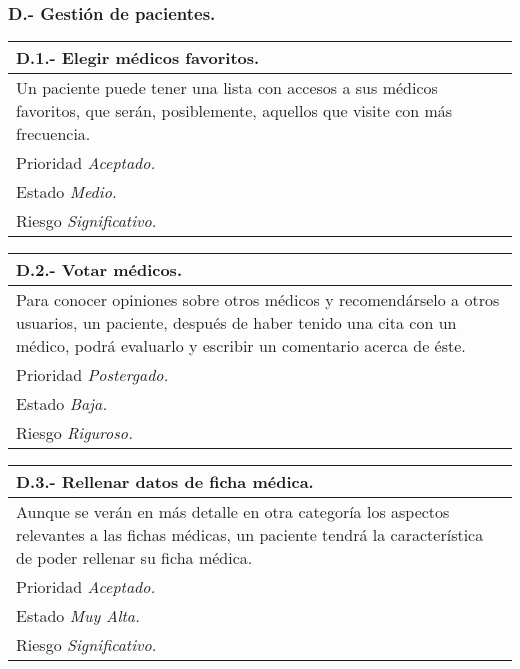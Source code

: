 \documentclass[a4paper,oneside,11pt]{book}
\begin{document}
\subsubsection{D.- Gestión de pacientes.}

\begin{center}
\begin{tabulary}{15cm}{|L|}
	\hline
		\bf{D.1.- Elegir médicos favoritos.} \\
	\hline
		Un paciente puede tener una lista con accesos a sus médicos favoritos, que serán, posiblemente, aquellos que visite con más frecuencia. \\
	\hline
		Prioridad \textit{Aceptado.} \\
	\hline
		Estado \textit{Medio.} \\
	\hline
		Riesgo \textit{Significativo.} \\
	\hline
\end{tabulary}
\end{center}

\begin{center}
\begin{tabulary}{15cm}{|L|}
	\hline
		\bf{D.2.- Votar médicos.} \\
	\hline
		Para conocer opiniones sobre otros médicos y recomendárselo a otros usuarios, un paciente, después de haber tenido una cita con un médico, podrá evaluarlo y escribir un comentario acerca de éste. \\
	\hline
		Prioridad \textit{Postergado.} \\
	\hline
		Estado \textit{Baja.} \\
	\hline
		Riesgo \textit{Riguroso.} \\
	\hline
\end{tabulary}
\end{center}

\begin{center}
\begin{tabulary}{15cm}{|L|}
	\hline
		\bf{D.3.- Rellenar datos de ficha médica.} \\
	\hline
		Aunque se verán en más detalle en otra categoría los aspectos relevantes a las fichas médicas, un paciente tendrá la característica de poder rellenar su ficha médica. \\
	\hline
		Prioridad \textit{Aceptado.} \\
	\hline
		Estado \textit{Muy Alta.} \\
	\hline
		Riesgo \textit{Significativo.} \\
	\hline
\end{tabulary}
\end{center}
\end{document}
